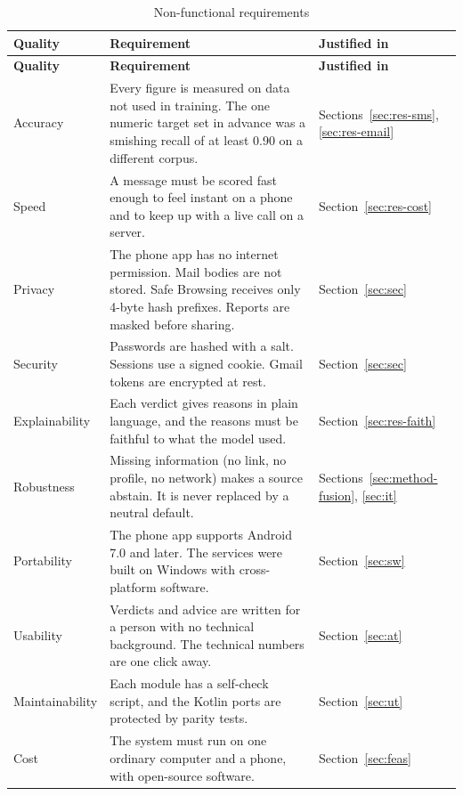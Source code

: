 {{\small{}
\begin{longtable}{|p{2.6cm}|p{8.2cm}|p{3.6cm}|}
\caption{Non-functional requirements}\label{tab:nfr}\\
\hline \textbf{Quality} & \textbf{Requirement} & \textbf{Justified in} \\ \hline
\endfirsthead
\hline \textbf{Quality} & \textbf{Requirement} & \textbf{Justified in} \\ \hline
\endhead
\hline
\endfoot
Accuracy & Every figure is measured on data not used in training. The one numeric target set in advance was a smishing recall of at least 0.90 on a different corpus. & Sections~\ref{sec:res-sms}, \ref{sec:res-email} \\ \hline
Speed & A message must be scored fast enough to feel instant on a phone and to keep up with a live call on a server. & Section~\ref{sec:res-cost} \\ \hline
Privacy & The phone app has no internet permission. Mail bodies are not stored. Safe Browsing receives only 4-byte hash prefixes. Reports are masked before sharing. & Section~\ref{sec:sec} \\ \hline
Security & Passwords are hashed with a salt. Sessions use a signed cookie. Gmail tokens are encrypted at rest. & Section~\ref{sec:sec} \\ \hline
Explainability & Each verdict gives reasons in plain language, and the reasons must be faithful to what the model used. & Section~\ref{sec:res-faith} \\ \hline
Robustness & Missing information (no link, no profile, no network) makes a source abstain. It is never replaced by a neutral default. & Sections~\ref{sec:method-fusion}, \ref{sec:it} \\ \hline
Portability & The phone app supports Android 7.0 and later. The services were built on Windows with cross-platform software. & Section~\ref{sec:sw} \\ \hline
Usability & Verdicts and advice are written for a person with no technical background. The technical numbers are one click away. & Section~\ref{sec:at} \\ \hline
Maintainability & Each module has a self-check script, and the Kotlin ports are protected by parity tests. & Section~\ref{sec:ut} \\ \hline
Cost & The system must run on one ordinary computer and a phone, with open-source software. & Section~\ref{sec:feas} \\ \hline
\end{longtable}
}

}
